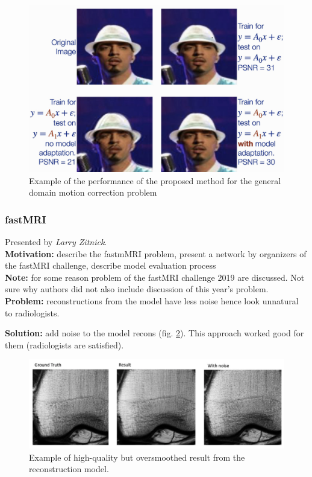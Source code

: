 \begin{figure}[h!]
    \centering
    \includegraphics[scale=0.4]{neurips-2020/images/Screenshot 2020-12-13 at 21.13.52.png}
    \caption{Example of the performance of the proposed method for the general domain motion correction problem}
    \label{fig:moco_recon}
\end{figure}





\subsubsection{fastMRI}

Presented by \textit{Larry Zitnick}. \\

{\bf Motivation:} describe the fastmMRI problem, present a network by organizers of the fastMRI challenge, describe model evaluation process \\

{\bf Note:} for some reason problem of the fastMRI challenge 2019 are discussed. 
Not sure why authors did not also include discussion of this year's problem. \\

{\bf Problem:} reconstructions from the model have less noise hence look unnatural to radiologists.

{\bf Solution:} add noise to the model recons (fig. \ref{fig:smooth_fastmri}). 
This approach worked good for them (radiologists are satisfied). \\

\begin{figure}[h!]
    \centering
    \includegraphics[scale=0.4]{neurips-2020/images/Screenshot 2020-12-13 at 22.23.29.png}
    \caption{Example of high-quality but oversmoothed result from the reconstruction model.}
    \label{fig:smooth_fastmri}
\end{figure}

